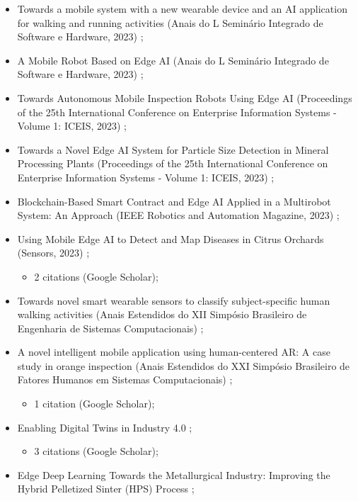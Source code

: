 \begin{itemize}
    \item Towards a mobile system with a new wearable device and an AI application for walking and running activities (Anais do L Semin{\'a}rio Integrado de Software e Hardware, 2023) \cite{alvim2023towards};
    \item A Mobile Robot Based on Edge AI (Anais do L Semin{\'a}rio Integrado de Software e Hardware, 2023) \cite{santos2023mobile};
    \item Towards Autonomous Mobile Inspection Robots Using Edge {AI} (Proceedings of the 25th International Conference on Enterprise Information Systems - Volume 1: ICEIS, 2023) \cite{Santos2023};
    \item Towards a Novel Edge AI System for Particle Size Detection in Mineral Processing Plants (Proceedings of the 25th International Conference on Enterprise Information Systems - Volume 1: ICEIS, 2023) \cite{Cardoso2023};
    \item Blockchain-Based Smart Contract and Edge AI Applied in a Multirobot System: An Approach (IEEE Robotics and Automation Magazine, 2023) \cite{garrocho2023blockchain};
    \item Using Mobile Edge AI to Detect and Map Diseases in Citrus Orchards (Sensors, 2023) \cite{da2023using};
    \begin{itemize}
        \item 2 citations (Google Scholar);
    \end{itemize}
    \item Towards novel smart wearable sensors to classify subject-specific human walking activities (Anais Estendidos do XII Simp{\'o}sio Brasileiro de Engenharia de Sistemas Computacionais) \cite{da2022towards2};
    \item A novel intelligent mobile application using human-centered AR: A case study in orange inspection (Anais Estendidos do XXI Simp{\'o}sio Brasileiro de Fatores Humanos em Sistemas Computacionais) \cite{da2022novel};
    \begin{itemize}
        \item 1 citation (Google Scholar);
    \end{itemize}
    \item Enabling Digital Twins in Industry 4.0 \cite{vitor2022enabling};
    \begin{itemize}
        \item 3 citations (Google Scholar);
    \end{itemize}
    \item Edge Deep Learning Towards the Metallurgical Industry: Improving the Hybrid Pelletized Sinter (HPS) Process \cite{de2022edge};

\end{itemize}
